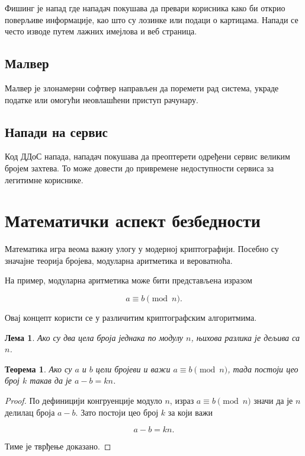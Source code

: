\documentclass[12pt,a4paper]{article}
\newtheorem{theorem}{Теорема}[section]
\newtheorem{lemma}{Лема}[section]
\begin{document}
Фишинг је напад где нападач покушава да превари корисника како би открио поверљиве информације, као што су лозинке или подаци о картицама. Напади се често изводе путем лажних имејлова и веб страница.

\subsection{Малвер}

Малвер је злонамерни софтвер направљен да поремети рад система, украде податке или омогући неовлашћени приступ рачунару.

\subsection{Напади на сервис}

Код ДДоС напада, нападач покушава да преоптерети одређени сервис великим бројем захтева. То може довести до привремене недоступности сервиса за легитимне кориснике.

\section{Математички аспект безбедности}

Математика игра веома важну улогу у модерној криптографији. Посебно су значајне теорија бројева, модуларна аритметика и вероватноћа.

На пример, модуларна аритметика може бити представљена изразом

\[
a \equiv b \pmod n.
\]

Овај концепт користи се у различитим криптографским алгоритмима.

\begin{lemma}
Ако су два цела броја једнака по модулу $n$, њихова разлика је дељива са $n$.
\end{lemma}

\begin{theorem}
Ако су $a$ и $b$ цели бројеви и важи $a \equiv b \pmod n$, тада постоји цео број $k$ такав да је $a-b=kn$.
\end{theorem}

\begin{proof}
По дефиницији конгруенције модуло $n$, израз $a \equiv b \pmod n$ значи да је $n$ делилац броја $a-b$. Зато постоји цео број $k$ за који важи

\[
a-b=kn.
\]

Тиме је тврђење доказано.
\end{proof}
\end{document}
